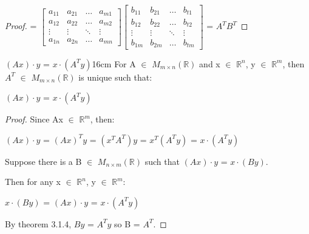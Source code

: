 \begin{proof}
        \hspace{1.15cm}
        =
        $\begin{bmatrix}
            a_{11} & a_{21} & \hdots & a_{m1} \\
            a_{12} & a_{22} & \hdots & a_{m2} \\
            \vdots & \vdots & \ddots & \vdots \\
            a_{1n} & a_{2n} & \hdots & a_{mn}
        \end{bmatrix}
        \begin{bmatrix}
            b_{11} & b_{21} & \hdots & b_{t1} \\
            b_{12} & b_{22} & \hdots & b_{t2} \\
            \vdots & \vdots & \ddots & \vdots \\
            b_{1m} & b_{2m} & \hdots & b_{tm}
        \end{bmatrix}$
        = $A^T B^T$
    \end{proof}

    \newpage



    \begin{corollary}{$(Ax) \cdot y$ = $x \cdot (A^Ty)$}{16cm}
        For A $\in$ $M_{m \times n}(\mathbb{R})$ and x $\in$ $\mathbb{R}^n$,
        y $\in$ $\mathbb{R}^m$, then $A^T$ $\in$ $M_{m \times n}(\mathbb{R})$
        is unique such that:

        \hspace{0.5cm}
        $(Ax) \cdot y$
        = $x \cdot (A^Ty)$
    \end{corollary}

    \begin{proof}
        Since Ax $\in$ $\mathbb{R}^m$, then:

        \hspace{0.5cm}
        $(Ax) \cdot y$
        = $(Ax)^Ty$
        = $(x^T A^T) y$
        = $x^T (A^T y)$
        = $x \cdot (A^T y)$

        Suppose there is a B $\in$ $M_{n \times m}(\mathbb{R})$
        such that $(Ax) \cdot y$ = $x \cdot (By)$.
        
        Then for any x $\in$ $\mathbb{R}^n$,
        y $\in$ $\mathbb{R}^m$:

        \hspace{0.5cm}
        $x \cdot (By)$
        = $(Ax) \cdot y$
        = $x \cdot (A^T y)$

        By {\color{red} theorem 3.1.4},
        $B y$ = $A^T y$ so B = $A^T$.
    \end{proof}

